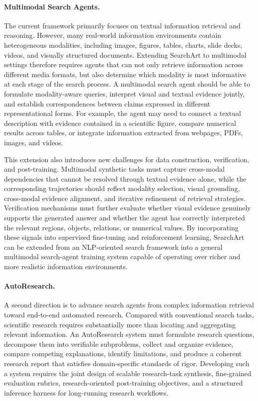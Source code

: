 \documentclass{huawei}
\begin{document}
\paragraph{Multimodal Search Agents.}
The current framework primarily focuses on textual information retrieval and reasoning. However, many real-world information environments contain heterogeneous modalities, including images, figures, tables, charts, slide decks, videos, and visually structured documents. Extending SearchArt to multimodal settings therefore requires agents that can not only retrieve information across different media formats, but also determine which modality is most informative at each stage of the search process. A multimodal search agent should be able to formulate modality-aware queries, interpret visual and textual evidence jointly, and establish correspondences between claims expressed in different representational forms. For example, the agent may need to connect a textual description with evidence contained in a scientific figure, compare numerical results across tables, or integrate information extracted from webpages, PDFs, images, and videos.


This extension also introduces new challenges for data construction, verification, and post-training. Multimodal synthetic tasks must capture cross-modal dependencies that cannot be resolved through textual evidence alone, while the corresponding trajectories should reflect modality selection, visual grounding, cross-modal evidence alignment, and iterative refinement of retrieval strategies. Verification mechanisms must further evaluate whether visual evidence genuinely supports the generated answer and whether the agent has correctly interpreted the relevant regions, objects, relations, or numerical values. By incorporating these signals into supervised fine-tuning and reinforcement learning, SearchArt can be extended from an NLP-oriented search framework into a general multimodal search-agent training system capable of operating over richer and more realistic information environments.

\paragraph{AutoResearch.}
A second direction is to advance search agents from complex information retrieval toward end-to-end automated research. Compared with conventional search tasks, scientific research requires substantially more than locating and aggregating relevant information. An AutoResearch system must formulate research questions, decompose them into verifiable subproblems, collect and organize evidence, compare competing explanations, identify limitations, and produce a coherent research report that satisfies domain-specific standards of rigor. Developing such a system requires the joint design of scalable research-task synthesis, fine-grained evaluation rubrics, research-oriented post-training objectives, and a structured inference harness for long-running research workflows.
\end{document}
